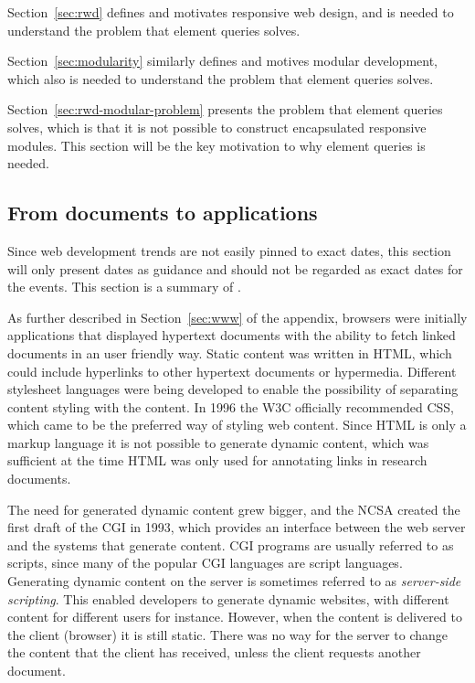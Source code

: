 \documentclass[a4paper,11pt]{kth-mag}
\begin{document}
      Section~\ref{sec:rwd} defines and motivates responsive web design, and is needed to understand the problem that element queries solves.

      Section~\ref{sec:modularity} similarly defines and motives modular development, which also is needed to understand the problem that element queries solves.

      Section~\ref{sec:rwd-modular-problem} presents the problem that element queries solves, which is that it is not possible to construct encapsulated responsive modules.
      This section will be the key motivation to why element queries is needed.

      \subsection{From documents to applications}\label{sec:doc-to-app}
        Since \gls{web} development trends are not easily pinned to exact dates, this section will only present dates as guidance and should not be regarded as exact dates for the events.
        This section is a summary of .

        As further described in Section~\ref{sec:www} of the appendix, \glspl{browser} were initially applications that displayed \gls{hypertext} \glspl{document} with the ability to fetch linked \glspl{document} in an user friendly way.
        Static content was written in \gls{HTML}, which could include hyperlinks to other \gls{hypertext} \glspl{document} or hypermedia.
        Different stylesheet languages were being developed to enable the possibility of separating content styling with the content.
        In 1996 the \gls{W3C} officially recommended \gls{CSS}, which came to be the preferred way of styling \gls{web} content.
        Since \gls{HTML} is only a markup language it is not possible to generate dynamic content, which was sufficient at the time \gls{HTML} was only used for annotating links in research \glspl{document}.

        The need for generated dynamic content grew bigger, and the \gls{NCSA} created the first draft of the \gls{CGI} in 1993, which provides an interface between the \gls{web} server and the systems that generate content.
        \gls{CGI} programs are usually referred to as scripts, since many of the popular \gls{CGI} languages are script languages.
        Generating dynamic content on the server is sometimes referred to as \emph{server-side scripting}.
        This enabled developers to generate dynamic websites, with different content for different users for instance.
        However, when the content is delivered to the client (\gls{browser}) it is still static.
        There was no way for the server to change the content that the client has received, unless the client requests another \gls{document}.
\end{document}
